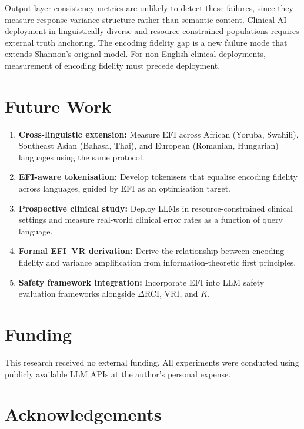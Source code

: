 \documentclass[11pt,a4paper]{article}
\begin{document}
Output-layer consistency metrics are unlikely to detect these failures, since they measure response variance structure rather than semantic content. Clinical AI deployment in linguistically diverse and resource-constrained populations requires external truth anchoring. The encoding fidelity gap is a new failure mode that extends Shannon's original model. For non-English clinical deployments, measurement of encoding fidelity must precede deployment.

\section{Future Work}

\begin{enumerate}
    \item \textbf{Cross-linguistic extension:} Measure EFI across African (Yoruba, Swahili), Southeast Asian (Bahasa, Thai), and European (Romanian, Hungarian) languages using the same protocol.
    \item \textbf{EFI-aware tokenisation:} Develop tokenisers that equalise encoding fidelity across languages, guided by EFI as an optimisation target.
    \item \textbf{Prospective clinical study:} Deploy LLMs in resource-constrained clinical settings and measure real-world clinical error rates as a function of query language.
    \item \textbf{Formal EFI--VR derivation:} Derive the relationship between encoding fidelity and variance amplification from information-theoretic first principles.
    \item \textbf{Safety framework integration:} Incorporate EFI into LLM safety evaluation frameworks alongside $\Delta$RCI, VRI, and $K$.
\end{enumerate}

\section*{Funding}

This research received no external funding. All experiments were conducted using publicly available LLM APIs at the author's personal expense.

\section*{Acknowledgements}
\end{document}
